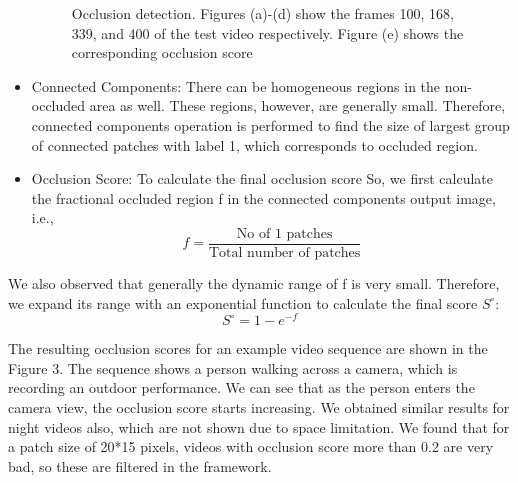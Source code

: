 \documentclass{clsfile}
\begin{document}
\begin{itemize}
\begin{figure}
   \caption{ Occlusion detection. Figures (a)-(d) show the frames 100, 168, 339, and 400 of the test video respectively. Figure (e) shows the corresponding occlusion score}

\end{figure}
\item Connected Components: There can be homogeneous regions
in the non-occluded area as well. These regions, however, are
generally small. Therefore, connected components operation
is performed to find the size of largest group of connected
patches with label 1, which corresponds to occluded region.
\item Occlusion Score: To calculate the final occlusion score So,
we first calculate the fractional occluded region f in the connected
components output image, i.e.,
\begin{equation}
    f=\frac{\text{No of 1 patches}}{\text{Total number of patches}}
\end{equation}
\end{itemize}
We also observed that generally the dynamic range of f is very
small. Therefore, we expand its range with an exponential function
to calculate the final score $S^{\circ}$:
\begin{equation}
    {S^{\circ}} = 1-e^{-f}
\end{equation}

The resulting occlusion scores for an example video sequence
are shown in the Figure 3. The sequence shows a person walking
across a camera, which is recording an outdoor performance. We
can see that as the person enters the camera view, the occlusion
score starts increasing. We obtained similar results for night videos
also, which are not shown due to space limitation. We found that
for a patch size of 20*15 pixels, videos with occlusion score more
than 0.2 are very bad, so these are filtered in the framework.
\end{document}
